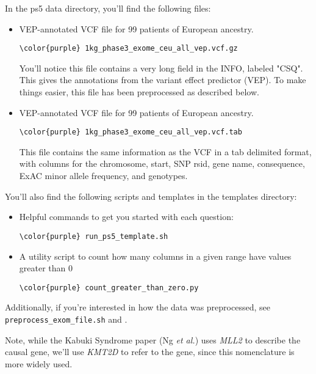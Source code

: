 \documentclass[12pt]{article}
\begin{document}
In the ps5 data directory, you'll find the following files:
\begin{itemize}
	\item VEP-annotated VCF file for 99 patients of European ancestry.
\begin{Verbatim}[commandchars=\\\{\}]
\color{purple} 1kg_phase3_exome_ceu_all_vep.vcf.gz 
\end{Verbatim}

You'll notice this file contains a very long field in the INFO, labeled "CSQ". This gives the annotations from the variant effect predictor (VEP). To make things easier, this file has been preprocessed as described below.

	\item VEP-annotated VCF file for 99 patients of European ancestry.
\begin{Verbatim}[commandchars=\\\{\}]
\color{purple} 1kg_phase3_exome_ceu_all_vep.vcf.tab 
\end{Verbatim}

This file contains the same information as the VCF in a tab delimited format, with columns for the chromosome, start, SNP rsid, gene name, consequence, ExAC minor allele frequency, and genotypes.

\end{itemize}

You'll also find the following scripts and templates in the templates directory:
\begin{itemize}
	\item Helpful commands to get you started with each question:
	\begin{Verbatim}[commandchars=\\\{\}]
\color{purple} run_ps5_template.sh 
\end{Verbatim}
	\item A utility script to count how many columns in a given range have values greater than 0
	\begin{Verbatim}[commandchars=\\\{\}]
\color{purple} count_greater_than_zero.py 
\end{Verbatim}
\end{itemize}
Additionally, if you're interested in how the data was preprocessed, see \texttt{preprocess\_exom\_file.sh} and .

Note, while the Kabuki Syndrome paper (Ng \emph{et al.}) uses \emph{MLL2} to describe the causal gene, we'll use \emph{KMT2D} to refer to the gene, since this nomenclature is more widely used.
\end{document}
